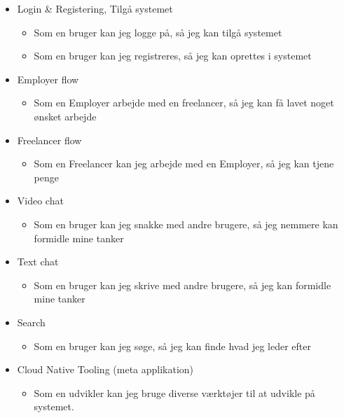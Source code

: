 \begin{itemize}
    \item Login \& Registering, Tilgå systemet
          \begin{itemize}
              \item Som en bruger kan jeg logge på, så jeg kan tilgå systemet
              \item Som en bruger kan jeg registreres, så jeg kan oprettes i systemet
          \end{itemize}
    \item Employer flow
          \begin{itemize}
              \item Som en Employer arbejde med en freelancer, så jeg kan få lavet noget ønsket arbejde
          \end{itemize}
    \item Freelancer flow
          \begin{itemize}
              \item Som en Freelancer kan jeg arbejde med en Employer, så jeg kan tjene penge
          \end{itemize}
    \item Video chat
          \begin{itemize}
              \item Som en bruger kan jeg snakke med andre brugere, så jeg nemmere kan formidle mine tanker
          \end{itemize}
    \item Text chat
          \begin{itemize}
              \item Som en bruger kan jeg skrive med andre brugere, så jeg kan formidle mine tanker
          \end{itemize}
    \item Search
          \begin{itemize}
              \item Som en bruger kan jeg søge, så jeg kan finde hvad jeg leder efter
          \end{itemize}
    \item Cloud Native Tooling (meta applikation)
          \begin{itemize}
              \item Som en udvikler kan jeg bruge diverse værktøjer til at udvikle på systemet.
          \end{itemize}
\end{itemize}

